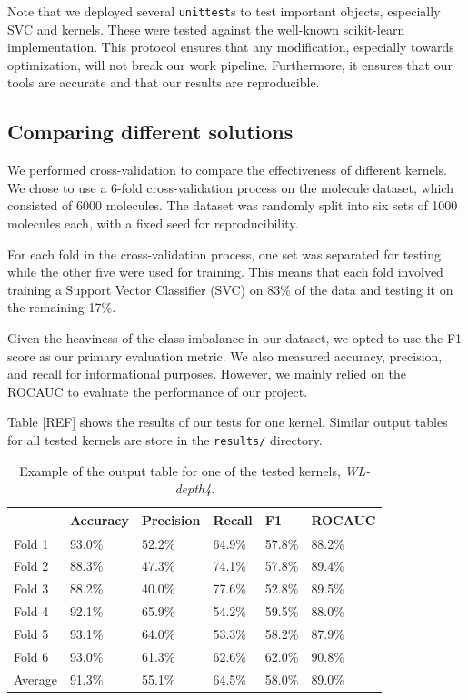 \documentclass{IEEEtran}
\begin{document}
Note that we deployed several \texttt{unittest}s to test important objects, especially SVC and kernels. These were tested against the well-known scikit-learn implementation. This protocol ensures that any modification, especially towards optimization, will not break our work pipeline. Furthermore, it ensures that our tools are accurate and that our results are reproducible.

\subsection{Comparing different solutions}
We performed cross-validation to compare the effectiveness of different kernels. We chose to use a 6-fold cross-validation process on the molecule dataset, which consisted of 6000 molecules. The dataset was randomly split into six sets of 1000 molecules each, with a fixed seed for reproducibility.

For each fold in the cross-validation process, one set was separated for testing while the other five were used for training. This means that each fold involved training a Support Vector Classifier (SVC) on 83\% of the data and testing it on the remaining 17\%.

Given the heaviness of the class imbalance in our dataset, we opted to use the F1 score as our primary evaluation metric. We also measured accuracy, precision, and recall for informational purposes. However, we mainly relied on the ROCAUC to evaluate the performance of our project.

Table [REF] shows the results of our tests for one kernel.
Similar output tables for all tested kernels are store in the \texttt{results/} directory.

\begin{table}[h]
    \centering
    \begin{tabular}{l||llll|l}
                & Accuracy & Precision & Recall & F1     & ROCAUC \\
        \hline \hline
        Fold 1  & 93.0\%   & 52.2\%    & 64.9\% & 57.8\% & 88.2\% \\
        Fold 2  & 88.3\%   & 47.3\%    & 74.1\% & 57.8\% & 89.4\% \\
        Fold 3  & 88.2\%   & 40.0\%    & 77.6\% & 52.8\% & 89.5\% \\
        Fold 4  & 92.1\%   & 65.9\%    & 54.2\% & 59.5\% & 88.0\% \\
        Fold 5  & 93.1\%   & 64.0\%    & 53.3\% & 58.2\% & 87.9\% \\
        Fold 6  & 93.0\%   & 61.3\%    & 62.6\% & 62.0\% & 90.8\% \\
        \hline
        Average & 91.3\%   & 55.1\%    & 64.5\% & 58.0\% & 89.0\% \\
    \end{tabular}
    \caption{Example of the output table for one of the tested kernels, \emph{WL-depth4}.}
    \label{tab:example}
\end{table}
\end{document}
